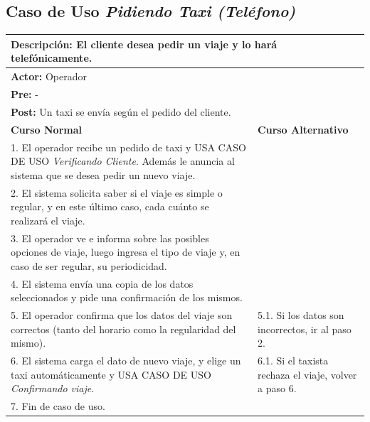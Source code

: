 \documentclass[a4paper]{article}
\begin{document}
\subsection{Caso de Uso \textit{Pidiendo Taxi (Tel\'efono)}}
\begin{center}
\begin{tabular}{|p{10cm} | p{6cm}|}
\hline
\multicolumn{2}{|p{15cm}|}{\textbf{Descripci\'on:} El cliente desea pedir un viaje y lo har\'a telef\'onicamente.} \\
\hline
\multicolumn{2}{|p{15cm}|}{\textbf{Actor:} Operador } \\
\hline
\multicolumn{2}{|p{15cm}|}{\textbf{Pre:} - } \\
\hline
\multicolumn{2}{|p{15cm}|}{\textbf{Post:} Un taxi se env\'ia seg\'un el pedido del cliente. }\\
\hline
\textbf{Curso Normal}  & \textbf{Curso Alternativo} \\ \hline
1. El operador recibe un pedido de taxi y USA CASO DE USO \textit{Verificando Cliente}. Adem\'as le anuncia al sistema que se desea pedir un nuevo viaje. & \\ \hline
2. El sistema solicita saber si el viaje es simple o regular, y en este \'ultimo caso, cada cu\'anto se realizar\'a el viaje. & \\ \hline
3. El operador ve e informa sobre las posibles opciones de viaje, luego ingresa el tipo de viaje y, en caso de ser regular, su periodicidad. & \\ \hline
4. El sistema env\'ia una copia de los datos seleccionados y pide una confirmaci\'on de los mismos. & \\ \hline
5. El operador confirma que los datos del viaje son correctos (tanto del horario como la regularidad del mismo). & 5.1. Si los datos son incorrectos, ir al paso 2. \\ \hline
6. El sistema carga el dato de nuevo viaje, y elige un taxi autom\'aticamente y USA CASO DE USO \textit{Confirmando viaje}. & 6.1. Si el taxista rechaza el viaje, volver a paso 6. \\ \hline
7. Fin de caso de uso. & \\ \hline
\end{tabular}
\end{center}
\end{document}
